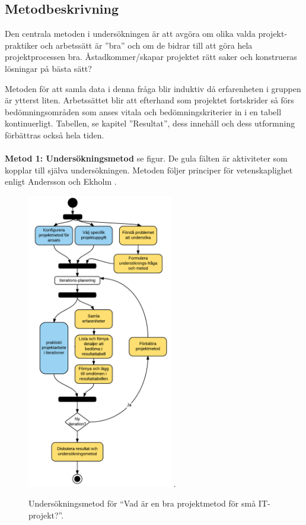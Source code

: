 \documentclass[conference,a4paper]{IEEEtran}
\begin{document}
\subsection{Metodbeskrivning}
Den centrala metoden i undersökningen är att avgöra om olika valda projekt-praktiker och arbetssätt är ”bra” och om de bidrar till att göra hela projektprocessen bra. Åstadkommer/skapar projektet rätt saker och konstrueras lösningar på bästa sätt?

Metoden för att samla data i denna fråga blir induktiv då erfarenheten i gruppen är ytterst liten. Arbetssättet blir att efterhand som projektet fortskrider så förs bedömningsområden som anses vitala och bedömningskriterier in i en tabell kontinuerligt. Tabellen, se kapitel ”Resultat”, dess innehåll och dess utformning förbättras också hela tiden.\\
\\
\textbf{Metod 1: Undersökningsmetod} se figur. De gula fälten är aktiviteter som kopplar till själva undersökningen. Metoden följer principer för vetenskaplighet enligt Andersson och Ekholm \cite{Andersson02}.

\begin{figure}[H]
\centering
\includegraphics[width=2.5in]{invmethod}
\DeclareGraphicsExtensions.
\caption{Undersökningsmetod för ``Vad är en bra projektmetod för små IT-projekt?''.}
\label{undersokningsmetod}
\end{figure}
\end{document}
